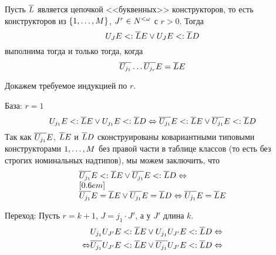 \begin{lem}{\label{lem:pcpuletter}}
    Пусть $\overline{{L}{}}$ является цепочкой <<буквенных>> конструкторов, то есть конструкторов из  $\{{1}{},\ldots,{M}{}\}$, $J^r\in N^{<\omega}$ с  $r > 0$. Тогда
\[
    {U}_{J}{E} <: \overline{{L}{}}{E} \lor {U}_{J}{E} <: \overline{{L}{}}D
\]
выполнима тогда и только тогда, когда
\[
     \overline{{U}_{j_1}}\ldots\overline{{U}_{j_r}}{E} = \overline{{L}{}}{E}
\]
\end{lem}
\begin{proof*}
Докажем требуемое индукцией по $r$.

\begin{paragraph}{База: $r = 1$}
\[
    {U}_{j_1}{E} <: \overline{{L}{}}{E} \lor {U}_{j_1}{E} <: \overline{{L}{}}D \Leftrightarrow \overline{{U}_{j_1}}{E} <: \overline{{L}{}}{E} \lor \overline{{U}_{j_1}}{E} <: \overline{{L}{}}D
\]
Так как $\overline{{U}_{j_1}}{E}$, $\overline{{L}{}}{E}$ и $\overline{{L}{}}D$ сконструированы ковариантными типовыми конструкторами ${1},\ldots,{M}$ без правой части в таблице классов (то есть без строгих номинальных надтипов), мы можем заключить, что
\[
    \begin{array}{l}
        \overline{{U}_{j_1}}{E} <: \overline{{L}{}}{E} \lor \overline{{U}_{j_1}}{E} <: \overline{{L}{}}D
        \Leftrightarrow \\
        [0.6em] \\
        \overline{{U}_{j_1}}{E} = \overline{{L}{}}{E} \lor \overline{{U}_{j_1}}{E} = \overline{{L}{}}D
        \Leftrightarrow \overline{{U}_{j_1}}{E} = \overline{{L}{}}{E}
    \end{array}
\]
\end{paragraph}

\begin{paragraph}{Переход:}
Пусть $r = k + 1$, $J = j_1 \cdot J'$, а у $J'$ длина $k$.
\begin{align*}
    &{U}_{j_1}{U}_{J'}{E} <: \overline{{L}{}} {E} \lor {U}_{j_1}{U}_{J'}{E} <: \overline{{L}{}}D \Leftrightarrow \\
     \Leftrightarrow &\overline{{U}_{j_1}}{U}_{J'}{E} <: \overline{{L}{}} {E} \lor \overline{{U}_{j_1}}{U}_{J'}{E} <: \overline{{L}{}}D \Leftrightarrow
\end{align*}
%


\end{paragraph}
\end{proof*}
